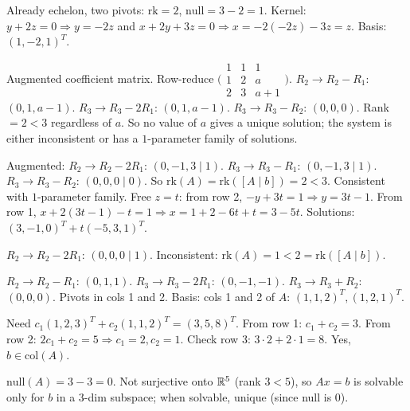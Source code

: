 \begin{solutions}
    \item Already echelon, two pivots: $\mathrm{rk} = 2$, $\mathrm{null} = 3 - 2 = 1$. Kernel: $y + 2 z = 0 \Rightarrow y = -2 z$ and $x + 2 y + 3 z = 0 \Rightarrow x = -2(-2 z) - 3 z = z$. Basis: $(1, -2, 1)^{T}$.

    \item Augmented coefficient matrix. Row-reduce $\bigl(\begin{smallmatrix} 1 & 1 & 1 \\ 1 & 2 & a \\ 2 & 3 & a + 1 \end{smallmatrix}\bigr)$. $R_{2} \to R_{2} - R_{1}$: $(0, 1, a - 1)$. $R_{3} \to R_{3} - 2 R_{1}$: $(0, 1, a - 1)$. $R_{3} \to R_{3} - R_{2}$: $(0, 0, 0)$. Rank $= 2 < 3$ regardless of $a$. So no value of $a$ gives a unique solution; the system is either inconsistent or has a $1$-parameter family of solutions.

    \item Augmented: $R_{2} \to R_{2} - 2 R_{1}$: $(0, -1, 3 \mid 1)$. $R_{3} \to R_{3} - R_{1}$: $(0, -1, 3 \mid 1)$. $R_{3} \to R_{3} - R_{2}$: $(0, 0, 0 \mid 0)$. So $\mathrm{rk}(A) = \mathrm{rk}([A \mid b]) = 2 < 3$. Consistent with $1$-parameter family. Free $z = t$: from row 2, $-y + 3 t = 1 \Rightarrow y = 3 t - 1$. From row 1, $x + 2(3 t - 1) - t = 1 \Rightarrow x = 1 + 2 - 6 t + t = 3 - 5 t$. Solutions: $(3, -1, 0)^{T} + t(-5, 3, 1)^{T}$.

    \item $R_{2} \to R_{2} - 2 R_{1}$: $(0, 0, 0 \mid 1)$. Inconsistent: $\mathrm{rk}(A) = 1 < 2 = \mathrm{rk}([A \mid b])$.

    \item $R_{2} \to R_{2} - R_{1}$: $(0, 1, 1)$. $R_{3} \to R_{3} - 2 R_{1}$: $(0, -1, -1)$. $R_{3} \to R_{3} + R_{2}$: $(0, 0, 0)$. Pivots in cols 1 and 2. Basis: cols 1 and 2 of $A$: $(1, 1, 2)^{T}, (1, 2, 1)^{T}$.

    \item Need $c_{1}(1, 2, 3)^{T} + c_{2}(1, 1, 2)^{T} = (3, 5, 8)^{T}$. From row 1: $c_{1} + c_{2} = 3$. From row 2: $2 c_{1} + c_{2} = 5 \Rightarrow c_{1} = 2, c_{2} = 1$. Check row 3: $3 \cdot 2 + 2 \cdot 1 = 8$. Yes, $b \in \mathrm{col}(A)$.

    \item $\mathrm{null}(A) = 3 - 3 = 0$. Not surjective onto $\mathbb{R}^{5}$ (rank $3 < 5$), so $A x = b$ is solvable only for $b$ in a $3$-dim subspace; when solvable, unique (since null is $0$).


\end{solutions}
